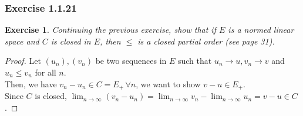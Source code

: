\documentclass[11pt,xcolor={dvipsnames},hyperref={pdftex,pdfpagemode=UseNone,hidelinks,pdfdisplaydoctitle=true},usepdftitle=false]{beamer}
\newtheorem{exercise}{Exercise}[section]
\begin{document}
\begin{frame}
\frametitle{Exercise 1.1.21}
\begin{exercise}
Continuing the previous exercise, show that if $E$ is a normed linear space and $C$ is closed in $E$, then $\leq$ is a closed partial order (see page 31).
\end{exercise}

\begin{proof}
Let $(u_n), (v_n)$ be two sequences in $E$ such that $u_n\to u, v_n\to v$ and $u_n\le v_n$ for all $n$.\\
Then, we have $v_n-u_n\in C = E_+\,\forall n$, we want to show $v-u\in E_+$.\\
Since $C$ is closed, $\lim_{n\to\infty} (v_n-u_n) = \lim_{n\to\infty} v_n -\lim_{n\to\infty} u_n = v-u \in C$.
\end{proof}
\end{frame}
\end{document}
